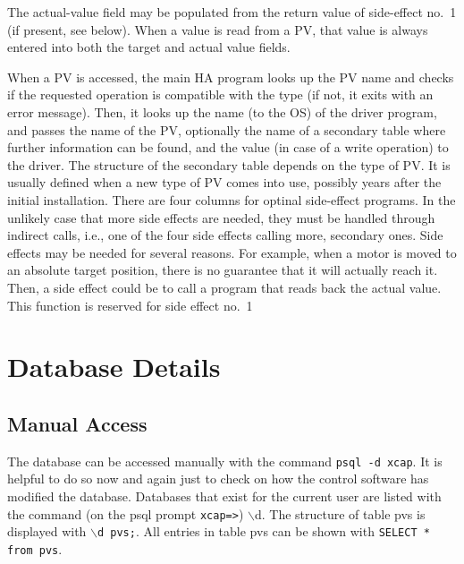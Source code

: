 \documentclass[10pt]{revtex4}
\begin{document}
The actual-value field may be populated from the return value of
side-effect no.\ 1 (if present, see below). 
When a value is read from a PV, that value is always entered into both the
target and actual value fields.
\par
When a PV is accessed, the main HA program looks up the PV name and
checks if the requested operation is compatible with the type (if not,
it exits with an error message).
Then, it looks up the name (to the OS) of the driver program, and passes
the name of the PV, optionally the name of a secondary table where further
information can be found, and the value (in case of a write operation) to the
driver.
The structure of the secondary table depends on the type of PV.
It is usually defined when a new type of PV comes into use, possibly
years after the initial installation.
There are four columns for optinal side-effect programs.
In the unlikely case that more side effects are needed, they must be
handled through indirect calls, i.e., one of the four side effects
calling more, secondary ones.
Side effects may be needed for several reasons.
For example, when a motor is moved to an absolute target position,
there is no guarantee that it will actually reach it.
Then, a side effect could be to call a program that reads back the
actual value.
This function is reserved for side effect no.\ 1



\section{Database Details}
\subsection{Manual Access}
The database can be accessed manually with the command {\tt psql -d xcap}.
It is helpful to do so now and again just to check on how the control
software has modified the database.
Databases that exist for the current user are listed with the command
(on the psql prompt {\tt xcap=>}) $\backslash$d.
The structure of table pvs is displayed with {\tt $\backslash$d pvs;}.
All entries in table pvs can be shown with {\tt SELECT * from pvs}.
\end{document}
